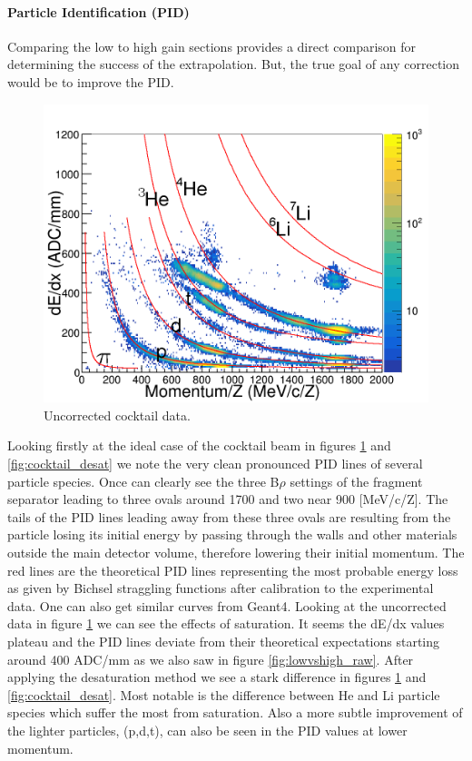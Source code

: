 \documentclass[review]{elsarticle}
\begin{document}
\paragraph{Particle Identification (PID)}

Comparing the low to high gain sections provides a direct comparison for determining the success of the extrapolation. But, the true goal of any correction would be to improve the PID. 

\begin{figure}[H]
\includegraphics[width=\linewidth]{cocktail_raw}
\caption{Uncorrected cocktail data.}
\label{fig:cocktail_raw}
\end{figure}

Looking firstly at the ideal case of the cocktail beam in figures \ref{fig:cocktail_raw} and \ref{fig:cocktail_desat} we note the very clean pronounced PID lines of several particle species. Once can clearly see the three  B$\rho$ settings of the fragment separator leading to three ovals around 1700 and two near 900 [MeV/c/Z]. The tails of the PID lines leading away from these three ovals are resulting from the particle losing its initial energy by passing through the walls and other materials outside the main detector volume, therefore lowering their initial momentum. The red lines are the theoretical PID lines representing the most probable energy loss as given by Bichsel straggling functions after calibration to the experimental data. One can also get similar curves from Geant4. Looking at the uncorrected data in figure \ref{fig:cocktail_raw} we can see the effects of saturation. It seems the dE/dx values plateau and the PID lines deviate from their theoretical expectations starting around 400 ADC/mm as we also saw in figure \ref{fig:lowvshigh_raw}. After applying the desaturation method we see a stark difference in figures \ref{fig:cocktail_raw} and \ref{fig:cocktail_desat}. Most notable is the difference between He and Li particle species which suffer the most from saturation. Also a more subtle improvement of the lighter particles, (p,d,t), can also be seen in the PID values at lower momentum.
\end{document}
